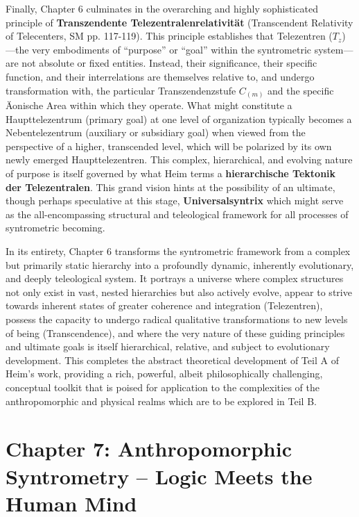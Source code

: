 \documentclass[12pt]{article}
\newcommand{\q}[1]{\enquote{#1}}
\newcommand{\telezentrum}{T_z}
\begin{document}
Finally, Chapter 6 culminates in the overarching and highly sophisticated principle of \textbf{Transzendente Telezentralenrelativität} (Transcendent Relativity of Telecenters, SM pp. 117-119). This principle establishes that Telezentren (\(\telezentrum\))—the very embodiments of \q{purpose} or \q{goal} within the syntrometric system—are not absolute or fixed entities. Instead, their significance, their specific function, and their interrelations are themselves relative to, and undergo transformation with, the particular Transzendenzstufe \( C_{(m)} \) and the specific Äonische Area within which they operate. What might constitute a Haupttelezentrum (primary goal) at one level of organization typically becomes a Nebentelezentrum (auxiliary or subsidiary goal) when viewed from the perspective of a higher, transcended level, which will be polarized by its own newly emerged Haupttelezentren. This complex, hierarchical, and evolving nature of purpose is itself governed by what Heim terms a \textbf{hierarchische Tektonik der Telezentralen}. This grand vision hints at the possibility of an ultimate, though perhaps speculative at this stage, \textbf{Universalsyntrix} which might serve as the all-encompassing structural and teleological framework for all processes of syntrometric becoming.

In its entirety, Chapter 6 transforms the syntrometric framework from a complex but primarily static hierarchy into a profoundly dynamic, inherently evolutionary, and deeply teleological system. It portrays a universe where complex structures not only exist in vast, nested hierarchies but also actively evolve, appear to strive towards inherent states of greater coherence and integration (Telezentren), possess the capacity to undergo radical qualitative transformations to new levels of being (Transcendence), and where the very nature of these guiding principles and ultimate goals is itself hierarchical, relative, and subject to evolutionary development. This completes the abstract theoretical development of Teil A of Heim's work, providing a rich, powerful, albeit philosophically challenging, conceptual toolkit that is poised for application to the complexities of the anthropomorphic and physical realms which are to be explored in Teil B.

\clearpage 
\section{Chapter 7: Anthropomorphic Syntrometry – Logic Meets the Human Mind}
\label{sec:chapter7}
\end{document}
